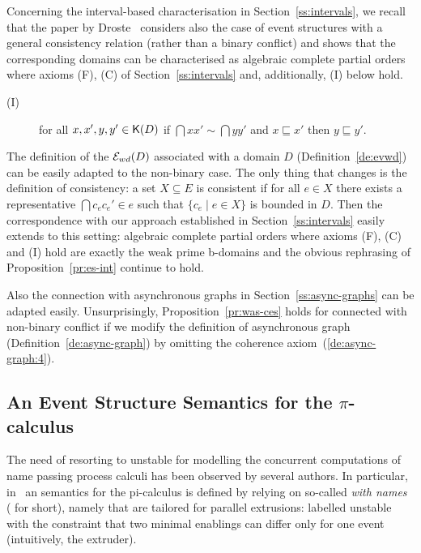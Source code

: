 Concerning the interval-based characterisation in
Section~\ref{ss:intervals}, we recall that the paper by
Droste~\cite{Dro:ESD} considers also the case of event structures with
a general consistency relation (rather than a binary conflict) and
shows that the corresponding domains can be characterised as
algebraic complete partial orders where
axioms (F), (C) of Section~\ref{ss:intervals} and, additionally, (I) below hold.

\begin{description}
\item[(I)] for all $x,x',y,y' \in \mathop{\mathsf{K}({D})}$ if $\dint{x}{x'} \sim \dint{y}{y'}$
  and $x \sqsubseteq x'$ then $y \sqsubseteq y'$.
\end{description}

The definition of the {\esabbr} $\mathcal{E}_{wd}({D})$ associated with a domain $D$
(Definition~\ref{de:evwd}) can be easily adapted to the non-binary
case. The only thing that changes is the definition of
consistency: a set $X \subseteq E$ is consistent if for all $e \in X$
there exists a representative $\dint{c_e}{c_e'} \in e$ such that
$\{ c_e \mid e \in X \}$ is bounded in $D$.
%
Then the correspondence with our approach established in
Section~\ref{ss:intervals} easily extends to this setting: algebraic
complete partial orders where axioms (F), (C) and (I) hold are exactly
the weak prime b-domains and the obvious rephrasing of
Proposition~\ref{pr:es-int} continue to hold.

Also the connection with asynchronous graphs in
Section~\ref{ss:async-graphs} can be adapted easily. Unsurprisingly,
Proposition~\ref{pr:was-ces} holds for connected {\esabbr} with
non-binary conflict if we modify the definition of asynchronous graph
(Definition~\ref{de:async-graph}) by omitting the coherence
axiom~(\ref{de:async-graph:4}).
 



%
%

\subsection{An Event Structure Semantics for the $\pi$-calculus}
\label{app:pi}


The need of resorting to unstable {\esabbr} for modelling the
concurrent computations of name passing process calculi has been
observed by several authors. In particular, in~\cite{CVY:ESSPE} an
{\esabbr} semantics for the pi-calculus is defined by relying on
so-called {\esabbr} \emph{with names} ({\esnmabbr} for short), namely
{\esabbr} that are tailored for parallel extrusions: labelled unstable
{\esabbr} with the constraint that two minimal enablings can differ
only for one event (intuitively, the extruder).


